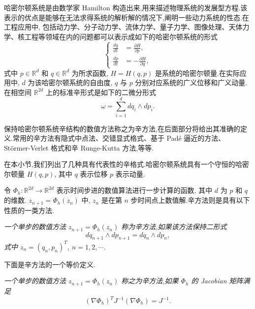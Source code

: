 哈密尔顿系统是由数学家 Hamilton 构造出来,用来描述物理系统的发展型方程.该表示的优点是能够在无法求得系统的解析解的情况下,阐明一些动力系统的性态.在工程应用中, 包括动力学、分子动力学、流体力学、量子力学、图像处理、天体力学、核工程等领域在内的问题都可以表示成如下的哈密尔顿系统的形式 \cite{arieh2009afirst}
\begin{equation}\label{eq:Hamiltonian}
\left\lbrace
\begin{aligned}
\frac{dq}{dt}&=\frac{\partial H}{\partial p},\\
\frac{dp}{dt}&=-\frac{\partial H}{\partial q},
\end{aligned}
\right.
\end{equation}
式中 $p \in \mathbb{R}^d$ 和 $q \in \mathbb{R}^d$ 为所求函数, $H=H(q,p)$ 是系统的哈密尔顿量.在实际应用中, $d$ 为该哈密尔顿系统的自由度, $q$ 与 $p$ 分别对应系统的广义位移和广义动量.在相空间 $\mathbb{R}^{2d}$ 上的标准辛形式是如下的二微分形式
\begin{equation*}
\omega = \sum_{i=1}^d d q_i \wedge d p_i.
\end{equation*}

保持哈密尔顿系统辛结构的数值方法称之为辛方法,在后面部分将给出其准确的定义.常用的辛方法有隐式中点法、交错显式格式、基于 Pad\'{e} 逼近的方法、 St\"{o}rmer-Verlet 格式和辛 Runge-Kutta 方法,等等.

在本小节,我们列出了几种具有代表性的辛格式.哈密尔顿系统具有一个守恒的哈密尔顿量 $H(q,p)$, 其中 $q$ 表示位移 $p$ 表示动量.


令 $\Phi_h : \mathbb{R}^{2d} \to \mathbb{R}^{2d}$ 表示时间步进的数值算法进行一步计算的函数, 其中 $d$ 为 $p$ 和 $q$ 的维数. $z_{n+1}=\Phi_h(z_n)$ 中, $z_n$ 是在第 $n$ 步时间点上数值解.辛方法则是具有以下性质的一类方法.

\begin{definition}
\emph{一个单步的数值方法 $z_{n+1}=\Phi_h(z_n)$ 称为辛方法,如果该方法保持二形式
\begin{equation*}
dq_{n+1}\wedge dp_{n+1}=dq_n\wedge dp_n,
\end{equation*}
式中 $z_n=(q_n,p_n)^T,~n=1,2,\cdots$.}
\end{definition}

下面是辛方法的一个等价定义.

\begin{definition}\label{def:symplectic}
\emph{一个单步的数值方法 $z_{n+1}=\Phi_h(z_n)$ 称之为辛方法,如果 $\Phi_h$ 的 Jacobian 矩阵满足
\begin{equation*}
(\nabla\Phi_h)^TJ^{-1}(\nabla\Phi_h)=J^{-1}.
\end{equation*}}
\end{definition}

